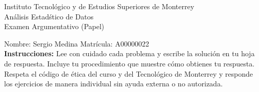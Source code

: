 \documentclass[10pt]{report}
\begin{document}
\newpage



\begin{center}
{\large Instituto Tecnol\'{o}gico y de Estudios Superiores de Monterrey \\
An\'alisis Estad\'stico de Datos } \\
Examen Argumentativo (Papel)
\end{center}

Nombre: \underline{\hspace*{.2in}}
Sergio Medina
\underline{\hspace*{.2in}} \quad Matr\'icula:\underline{\hspace*{.2in}}
A00000022
\underline{\hspace*{.2in}} \\

{\bf Instrucciones:} Lee con cuidado cada problema y escribe la soluci\'on
en tu hoja de respuesta. Incluye tu procedimiento que muestre c\'omo obtienes tu respuesta.  Respeta el c\'odigo de \'etica del curso y del Tecnol\'ogico de Monterrey y responde los ejercicios de manera individual sin ayuda externa o no autorizada.
\end{document}
